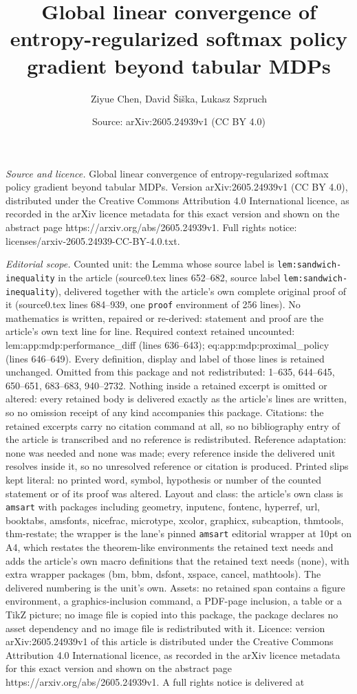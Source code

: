 \documentclass[10pt,a4paper]{amsart}
\title[Global linear convergence of entropy-regularized softmax pol]{Global linear convergence of entropy-regularized softmax policy gradient beyond tabular MDPs}
\author{Ziyue Chen, David \v{S}i\v{s}ka, Lukasz Szpruch}
\date{Source: arXiv:2605.24939v1 (CC BY 4.0)}
\begin{document}
\maketitle

\noindent\emph{Source and licence.} Global linear convergence of entropy-regularized softmax policy gradient beyond tabular MDPs. Version arXiv:2605.24939v1 (CC BY 4.0), distributed under the Creative Commons Attribution 4.0 International licence, as recorded in the arXiv licence metadata for this exact version and shown on the abstract page https://arxiv.org/abs/2605.24939v1. Full rights notice: licenses/arxiv-2605.24939-CC-BY-4.0.txt.\par\smallskip

\noindent\textit{Editorial scope.} Counted unit: the Lemma whose source label is \texttt{lem:sandwich-inequality} in the article (source0.tex lines 652--682, source label \texttt{lem:sandwich-inequality}), delivered together with the article's own complete original proof of it (source0.tex lines 684--939, one \texttt{proof} environment of 256 lines). No mathematics is written, repaired or re-derived: statement and proof are the article's own text line for line. Required context retained uncounted: lem:app:mdp:performance\_diff (lines 636--643); eq:app:mdp:proximal\_policy (lines 646--649). Every definition, display and label of those lines is retained unchanged. Omitted from this package and not redistributed: 1--635, 644--645, 650--651, 683--683, 940--2732. Nothing inside a retained excerpt is omitted or altered: every retained body is delivered exactly as the article's lines are written, so no omission receipt of any kind accompanies this package. Citations: the retained excerpts carry no citation command at all, so no bibliography entry of the article is transcribed and no reference is redistributed. Reference adaptation: none was needed and none was made; every reference inside the delivered unit resolves inside it, so no unresolved reference or citation is produced. Printed slips kept literal: no printed word, symbol, hypothesis or number of the counted statement or of its proof was altered. Layout and class: the article's own class is \texttt{amsart} with packages including geometry, inputenc, fontenc, hyperref, url, booktabs, amsfonts, nicefrac, microtype, xcolor, graphicx, subcaption, thmtools, thm-restate; the wrapper is the lane's pinned \texttt{amsart} editorial wrapper at 10pt on A4, which restates the theorem-like environments the retained text needs and adds the article's own macro definitions that the retained text needs (none), with extra wrapper packages (bm, bbm, dsfont, xspace, cancel, mathtools). The delivered numbering is the unit's own. Assets: no retained span contains a figure environment, a graphics-inclusion command, a PDF-page inclusion, a table or a TikZ picture; no image file is copied into this package, the package declares no asset dependency and no image file is redistributed with it. Licence: version arXiv:2605.24939v1 of this article is distributed under the Creative Commons Attribution 4.0 International licence, as recorded in the arXiv licence metadata for this exact version and shown on the abstract page https://arxiv.org/abs/2605.24939v1. A full rights notice is delivered at 
\end{document}
